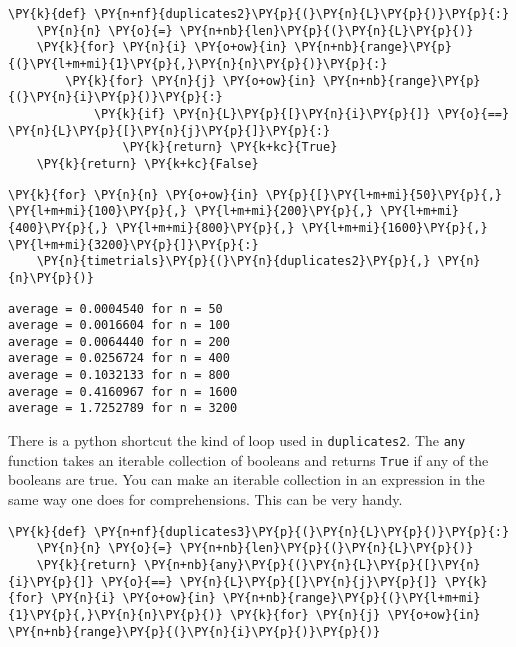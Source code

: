 \begin{Verbatim}[commandchars=\\\{\}]
\PY{k}{def} \PY{n+nf}{duplicates2}\PY{p}{(}\PY{n}{L}\PY{p}{)}\PY{p}{:}
    \PY{n}{n} \PY{o}{=} \PY{n+nb}{len}\PY{p}{(}\PY{n}{L}\PY{p}{)}
    \PY{k}{for} \PY{n}{i} \PY{o+ow}{in} \PY{n+nb}{range}\PY{p}{(}\PY{l+m+mi}{1}\PY{p}{,}\PY{n}{n}\PY{p}{)}\PY{p}{:}
        \PY{k}{for} \PY{n}{j} \PY{o+ow}{in} \PY{n+nb}{range}\PY{p}{(}\PY{n}{i}\PY{p}{)}\PY{p}{:}
            \PY{k}{if} \PY{n}{L}\PY{p}{[}\PY{n}{i}\PY{p}{]} \PY{o}{==} \PY{n}{L}\PY{p}{[}\PY{n}{j}\PY{p}{]}\PY{p}{:}
                \PY{k}{return} \PY{k+kc}{True}
    \PY{k}{return} \PY{k+kc}{False}
\end{Verbatim}



\begin{Verbatim}[commandchars=\\\{\}]
\PY{k}{for} \PY{n}{n} \PY{o+ow}{in} \PY{p}{[}\PY{l+m+mi}{50}\PY{p}{,} \PY{l+m+mi}{100}\PY{p}{,} \PY{l+m+mi}{200}\PY{p}{,} \PY{l+m+mi}{400}\PY{p}{,} \PY{l+m+mi}{800}\PY{p}{,} \PY{l+m+mi}{1600}\PY{p}{,} \PY{l+m+mi}{3200}\PY{p}{]}\PY{p}{:}
    \PY{n}{timetrials}\PY{p}{(}\PY{n}{duplicates2}\PY{p}{,} \PY{n}{n}\PY{p}{)}
\end{Verbatim}

\begin{Verbatim}
average = 0.0004540 for n = 50
average = 0.0016604 for n = 100
average = 0.0064440 for n = 200
average = 0.0256724 for n = 400
average = 0.1032133 for n = 800
average = 0.4160967 for n = 1600
average = 1.7252789 for n = 3200

\end{Verbatim}


There is a python shortcut the kind of loop used in \texttt{duplicates2}.
The \texttt{any} function takes an iterable collection of booleans and returns \texttt{True} if any of the booleans are true.
You can make an iterable collection in an expression in the same way one does for comprehensions.
This can be very handy.

\begin{Verbatim}[commandchars=\\\{\}]
\PY{k}{def} \PY{n+nf}{duplicates3}\PY{p}{(}\PY{n}{L}\PY{p}{)}\PY{p}{:}
    \PY{n}{n} \PY{o}{=} \PY{n+nb}{len}\PY{p}{(}\PY{n}{L}\PY{p}{)}
    \PY{k}{return} \PY{n+nb}{any}\PY{p}{(}\PY{n}{L}\PY{p}{[}\PY{n}{i}\PY{p}{]} \PY{o}{==} \PY{n}{L}\PY{p}{[}\PY{n}{j}\PY{p}{]} \PY{k}{for} \PY{n}{i} \PY{o+ow}{in} \PY{n+nb}{range}\PY{p}{(}\PY{l+m+mi}{1}\PY{p}{,}\PY{n}{n}\PY{p}{)} \PY{k}{for} \PY{n}{j} \PY{o+ow}{in} \PY{n+nb}{range}\PY{p}{(}\PY{n}{i}\PY{p}{)}\PY{p}{)}
\end{Verbatim}



